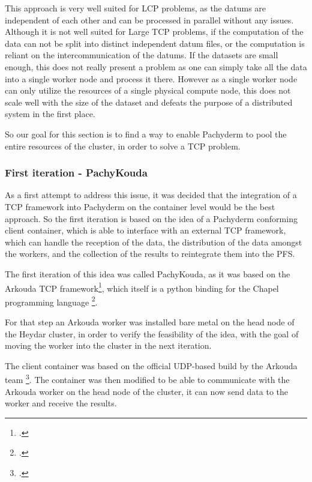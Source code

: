 This approach is very well suited for \ac{LCP} problems, as the datums are independent of each other and can be processed in parallel without any issues.
Although it is not well suited for Large \ac{TCP} problems, if the computation of the data can not be split into distinct independent datum files, or the computation is reliant on the intercommunication of the datums.
If the datasets are small enough, this does not really present a problem as one can simply take all the data into a single worker node and process it there.
However as a single worker node can only utilize the resources of a single physical compute node, this does not scale well with the size of the dataset and defeats the purpose of a distributed system in the first place.

So our goal for this section is to find a way to enable Pachyderm to pool the entire resources of the cluster, in order to solve a \ac{TCP} problem.

\subsubsection{First iteration - PachyKouda}

As a first attempt to address this issue, it was decided that the integration of a \ac{TCP} framework into Pachyderm on the container level would be the best approach.
So the first iteration is based on the idea of a Pachyderm conforming client container, which is able to interface with an external \ac{TCP} framework,
which can handle the reception of the data, the distribution of the data amongst the workers, and the collection of the results to reintegrate them into the \ac{PFS}.

The first iteration of this idea was called PachyKouda, as it was based on the Arkouda \ac{TCP} framework\footcite{ArkoudaGituhbRepository2023},
which itself is a python binding for the Chapel programming language \footcite{ChapellangChapelProductive}. 

For that step an Arkouda worker was installed bare metal on the head node of the Heydar cluster, in order to verify the feasibility of the idea,
with the goal of moving the worker into the cluster in the next iteration.

The client container was based on the official \ac{UDP}-based build by the Arkouda team \footcite{ArkoudacontribArkoudadockerMain}.
The container was then modified to be able to communicate with the Arkouda worker on the head node of the cluster, it can now send data to the worker and receive the results.

